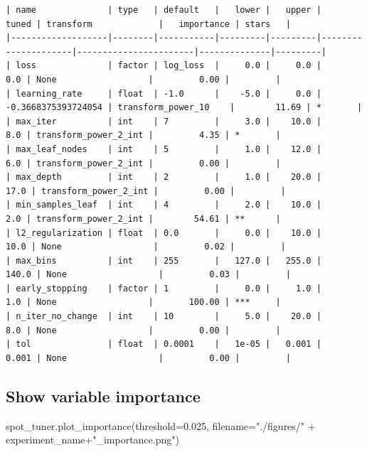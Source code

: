 \documentclass[
  letterpaper,
  DIV=11,
  numbers=noendperiod]{scrreprt}
\newenvironment{Shaded}{\begin{snugshade}}{\end{snugshade}}
\newcommand{\FloatTok}[1]{\textcolor[rgb]{0.68,0.00,0.00}{#1}}
\newcommand{\NormalTok}[1]{\textcolor[rgb]{0.00,0.23,0.31}{#1}}
\newcommand{\OperatorTok}[1]{\textcolor[rgb]{0.37,0.37,0.37}{#1}}
\newcommand{\StringTok}[1]{\textcolor[rgb]{0.13,0.47,0.30}{#1}}
\begin{document}
\begin{verbatim}
| name              | type   | default   |   lower |   upper |               tuned | transform             |   importance | stars   |
|-------------------|--------|-----------|---------|---------|---------------------|-----------------------|--------------|---------|
| loss              | factor | log_loss  |     0.0 |     0.0 |                 0.0 | None                  |         0.00 |         |
| learning_rate     | float  | -1.0      |    -5.0 |     0.0 | -0.3668375393724054 | transform_power_10    |        11.69 | *       |
| max_iter          | int    | 7         |     3.0 |    10.0 |                 8.0 | transform_power_2_int |         4.35 | *       |
| max_leaf_nodes    | int    | 5         |     1.0 |    12.0 |                 6.0 | transform_power_2_int |         0.00 |         |
| max_depth         | int    | 2         |     1.0 |    20.0 |                17.0 | transform_power_2_int |         0.00 |         |
| min_samples_leaf  | int    | 4         |     2.0 |    10.0 |                 2.0 | transform_power_2_int |        54.61 | **      |
| l2_regularization | float  | 0.0       |     0.0 |    10.0 |                10.0 | None                  |         0.02 |         |
| max_bins          | int    | 255       |   127.0 |   255.0 |               140.0 | None                  |         0.03 |         |
| early_stopping    | factor | 1         |     0.0 |     1.0 |                 1.0 | None                  |       100.00 | ***     |
| n_iter_no_change  | int    | 10        |     5.0 |    20.0 |                 8.0 | None                  |         0.00 |         |
| tol               | float  | 0.0001    |   1e-05 |   0.001 |               0.001 | None                  |         0.00 |         |
\end{verbatim}

\hypertarget{show-variable-importance-2}{%
\subsection{Show variable importance}\label{show-variable-importance-2}}

\begin{Shaded}
\begin{Highlighting}[]
\NormalTok{spot\_tuner.plot\_importance(threshold}\OperatorTok{=}\FloatTok{0.025}\NormalTok{, filename}\OperatorTok{=}\StringTok{"./figures/"} \OperatorTok{+}\NormalTok{ experiment\_name}\OperatorTok{+}\StringTok{"\_importance.png"}\NormalTok{)}
\end{Highlighting}
\end{Shaded}
\end{document}
